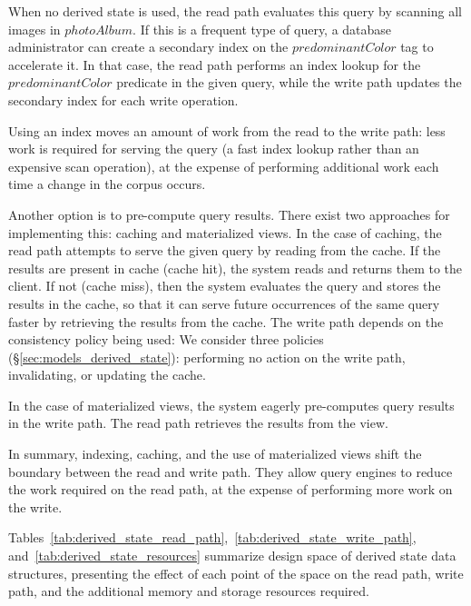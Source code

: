 \begin{sloppypar}
When no derived state is used, the read path evaluates this query by scanning all images in $photoAlbum$.
If this is a frequent type of query,
a database administrator can create a secondary index on the $predominantColor$ tag to accelerate it.
In that case, the read path performs an index lookup for the $predominantColor$ predicate in the given query,
while the write path updates the secondary index for each write operation.
\end{sloppypar}

Using an index moves an amount of work from the read to the write path:
less work is required for serving the query (a fast index lookup rather than an expensive scan operation),
at the expense of performing additional work each time a change in the corpus occurs.

Another option is to pre-compute query results.
There exist two approaches for implementing this: caching and materialized views.
In the case of caching, the read path attempts to serve the given query by reading from the cache.
If the results are present in cache (cache hit), the system reads and returns them to the client.
If not (cache miss), then the system evaluates the query and stores the results in the cache,
so that it can serve future occurrences of the same query faster by retrieving the results from the cache.
The write path depends on the consistency policy being used:
We consider three policies (\S\ref{sec:models_derived_state}):
performing no action on the write path, invalidating, or updating the cache.

In the case of materialized views, the system eagerly pre-computes query results in the write path.
The read path retrieves the results from the view.

In summary, indexing, caching, and the use of materialized views shift the boundary between the read and write path.
They allow query engines to reduce the work required on the read path, at the expense of performing more work on the write.

Tables~\ref{tab:derived_state_read_path},~\ref{tab:derived_state_write_path}, and~\ref{tab:derived_state_resources} summarize
design space of derived state data structures,
presenting the effect of each point of the space on the read path, write path, and the additional
memory and storage resources required.

